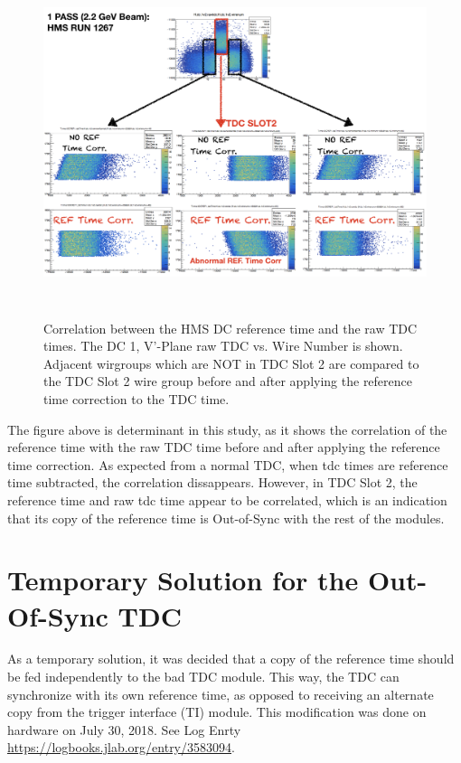 \documentclass[11pt]{article}
\begin{document}
\begin{figure}[h!]
  \centering
  \includegraphics[width=6.0in, height=4.0in]{hDC_RefTime_correlation.png}
  \caption{Correlation between the HMS DC reference time and the raw TDC times. The DC 1, V'-Plane raw TDC vs. Wire Number is shown. Adjacent wirgroups which
  are NOT in TDC Slot 2 are compared to the TDC Slot 2 wire group before and after applying the reference time correction to the TDC time.}
  \label{fig:wire_residual}
\end{figure}

\newpage
The figure above is determinant in this study, as it shows the correlation of the reference time with the raw TDC time before and after applying the reference time correction.
As expected from a normal TDC, when tdc times are reference time subtracted, the correlation dissappears. However, in TDC Slot 2, the reference time and raw tdc time appear to be
correlated, which is an indication that its copy of the reference time is Out-of-Sync with the rest of the modules.

\section{Temporary Solution for the Out-Of-Sync TDC}
\indent As a temporary solution, it was decided that a copy of the reference time should be fed independently to the bad TDC module. This way, the TDC can synchronize with its own
reference time, as opposed to receiving an alternate copy from the trigger interface (TI) module. This modification was done on hardware on July 30, 2018. See Log Enrty \url{https://logbooks.jlab.org/entry/3583094}.
\end{document}
